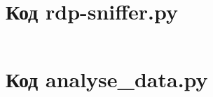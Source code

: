 \documentclass[bachelor, och, coursework]{SCWorks}
\begin{document}
  \appendix

    \section{Код rdp-sniffer.py}
    \inputminted[fontsize=\footnotesize]{Python}{code/sniffer.py}


    \section{Код analyse_data.py}
    \inputminted[fontsize=\footnotesize]{Python}{code/data-analysis.py}
\end{document}

